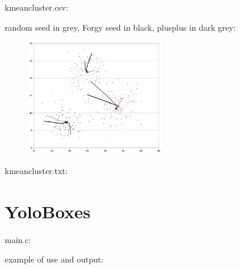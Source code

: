 \begin{scriptsize}
\begin{ttfamily}

\end{ttfamily}
\end{scriptsize}

kmeancluster.csv:\\
\begin{scriptsize}
\begin{ttfamily}

\end{ttfamily}
\end{scriptsize}

random seed in grey, Forgy seed in black, plusplus in dark grey:\\
\begin{center}
\begin{figure}[H]
\centering\includegraphics[width=6cm]{./kmeansclustering.png}\\
\end{figure}
\end{center}

kmeancluster.txt:\\
\begin{scriptsize}
\begin{ttfamily}

\end{ttfamily}
\end{scriptsize}

\section{YoloBoxes}

main.c:\\
\begin{scriptsize}
\begin{ttfamily}

\end{ttfamily}
\end{scriptsize}

example of use and output:\\
\begin{scriptsize}
\begin{ttfamily}

\end{ttfamily}
\end{scriptsize}
